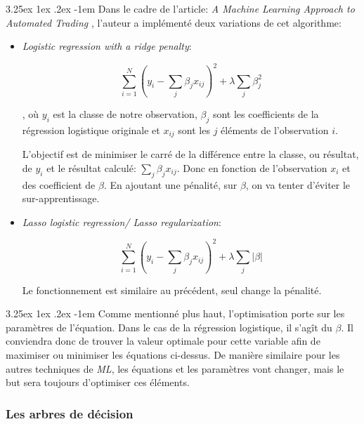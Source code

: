 \documentclass[a4paper, 11pt]{article}
\makeatletter
\renewcommand\paragraph{\@startsection{paragraph}{5}{\z@}%
  {3.25ex \@plus1ex \@minus.2ex}%
  {-1em}%
  {\normalfont\normalsize\bfseries}}
\makeatother
\begin{document}
\paragraph{}
Dans le cadre de l'article: \textit{A Machine Learning Approach to Automated Trading} \cite{machine_learning_automated_trading}, 
l'auteur a implémenté deux variations de cet algorithme:
\begin{itemize}
\item \textit{Logistic regression with a ridge penalty}:
\begin{center}
$$\sum_{i=1}^N (y_i - \sum_j\beta_j x_{ij})^2 + \lambda \sum_j \beta_j^2$$
\end{center}
, où $y_i$ est la classe de notre observation, $\beta_j$ sont les coefficients de la régression logistique originale \cite{machine_learning_automated_trading} et $x_{ij}$
sont les $j$ éléments de l'observation $i$.

L'objectif est de minimiser le carré de la différence entre la classe, ou résultat, de $y_i$ et le résultat 
calculé: $\sum\limits_j\beta_j x_{ij}$. Donc en fonction de l'observation $x_i$ et des coefficient de $\beta$.
En ajoutant une pénalité, sur $\beta$, on va tenter d'éviter le sur-apprentissage.

\item \textit{Lasso logistic regression/ Lasso regularization}:
\begin{center}
$$\sum_{i=1}^N (y_i - \sum_j\beta_j x_{ij})^2 + \lambda \sum_j |\beta|$$
\end{center}
Le fonctionnement est similaire au précédent, seul change la pénalité.

\end{itemize}

\paragraph{}
Comme mentionné plus haut, l'optimisation porte sur les paramètres de l'équation. Dans le cas de la régression logistique, 
il s'agît du $\beta$. Il conviendra donc de trouver la valeur optimale pour cette variable afin de maximiser ou minimiser 
les équations ci-dessus. De manière similaire pour les autres techniques de \textit{ML}, 
les équations et les paramètres vont changer, mais  le but sera toujours d'optimiser ces éléments. 

\subsubsection{Les arbres de décision}\label{section arbre de décision}
\end{document}
